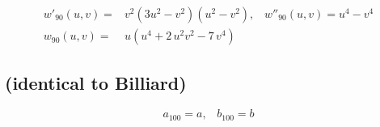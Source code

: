 \begin{align*}
w'_{90}(u,v)=&v^2(3u^2-v^2) (u^2-v^2),\;\;\;
w''_{90}(u,v)=u^4-v^4 \\
w_{90}(u,v)=& u \left( {u}^{4}+2\,{u}^{2}{v}^{2}-7\,{v}^{4} \right)
\end{align*}


\subsection{ (identical to Billiard)}

\begin{equation*}
    a_{100}=a,\;\;\;b_{100}=b
\end{equation*}

